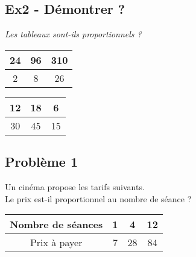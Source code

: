 \Pointilles[5]

\subsection*{Ex2 - Démontrer ?}

\textit{Les tableaux sont-ils proportionnels ? } 

\begin{multicols}{2}\noindent
  \begin{center}\begin{tabular}{|c|c|c|} \hline
    24 & 96 & 310 \\  \hline
    2 & 8 & 26\\  \hline
  \end{tabular}\end{center}

  \Pointilles[5]  \columnbreak 

  \begin{center}\begin{tabular}{|c|c|c|} \hline
    12 & 18 & 6 \\  \hline
    30 & 45 & 15\\  \hline
  \end{tabular}\end{center}

  \Pointilles[5] 

\end{multicols}

\newpage

\subsection*{Problème 1}

\begin{multicols}{2}\noindent

Un cinéma propose les tarifs suivants. \\
Le prix est-il proportionnel au nombre de séance ?


\begin{center}\begin{tabular}{|c|c|c|c|} \hline
  Nombre de séances & 1 &  4 & 12 \\  \hline
  Prix à payer      & 7 & 28 & 84\\  \hline
\end{tabular}\end{center}  \columnbreak 

\Pointilles[5] 

\end{multicols}

